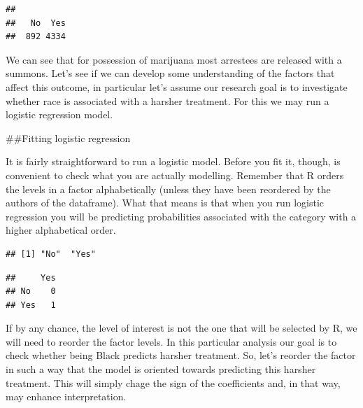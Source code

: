 \documentclass[]{book}
\newenvironment{Shaded}{\begin{snugshade}}{\end{snugshade}}
\newcommand{\CommentTok}[1]{\textcolor[rgb]{0.56,0.35,0.01}{\textit{#1}}}
\newcommand{\KeywordTok}[1]{\textcolor[rgb]{0.13,0.29,0.53}{\textbf{#1}}}
\newcommand{\NormalTok}[1]{#1}
\newcommand{\OperatorTok}[1]{\textcolor[rgb]{0.81,0.36,0.00}{\textbf{#1}}}
\theoremstyle{definition}
\theoremstyle{definition}
\theoremstyle{definition}
\theoremstyle{remark}
\begin{document}
\begin{verbatim}
## 
##   No  Yes 
##  892 4334
\end{verbatim}

We can see that for possession of marijuana most arrestees are released
with a summons. Let's see if we can develop some understanding of the
factors that affect this outcome, in particular let's assume our
research goal is to investigate whether race is associated with a
harsher treatment. For this we may run a logistic regression model.

\#\#Fitting logistic regression

It is fairly straightforward to run a logistic model. Before you fit it,
though, is convenient to check what you are actually modelling. Remember
that R orders the levels in a factor alphabetically (unless they have
been reordered by the authors of the dataframe). What that means is that
when you run logistic regression you will be predicting probabilities
associated with the category with a higher alphabetical order.

\begin{Shaded}
\end{Shaded}

\begin{verbatim}
## [1] "No"  "Yes"
\end{verbatim}

\begin{Shaded}
\end{Shaded}

\begin{verbatim}
##     Yes
## No    0
## Yes   1
\end{verbatim}

If by any chance, the level of interest is not the one that will be
selected by R, we will need to reorder the factor levels. In this
particular analysis our goal is to check whether being Black predicts
harsher treatment. So, let's reorder the factor in such a way that the
model is oriented towards predicting this harsher treatment. This will
simply chage the sign of the coefficients and, in that way, may enhance
interpretation.
\end{document}

